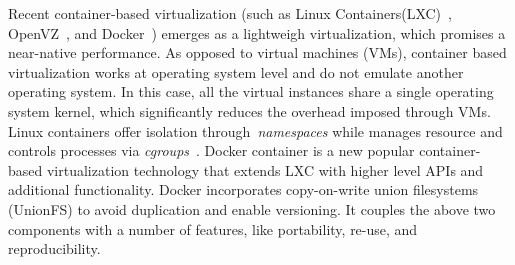 Recent container-based virtualization (such as Linux Containers(LXC)~\cite{xxx},
OpenVZ~\cite{bibid}, and Docker~\cite{}) emerges as a lightweigh virtualization,
which promises a near-native performance.
%
As opposed to virtual machines (VMs), container based virtualization works at
operating system level and do not emulate another operating system.
%
In this case, all the virtual instances share a single operating system kernel,
which significantly reduces the overhead imposed through VMs.
%
Linux containers offer isolation through~\textit{namespaces} while manages resource
and controls processes via \textit{cgroups}~\cite{}.
%
Docker container is a new popular container-based virtualization technology that
extends LXC with higher level APIs and additional functionality.
%
%
Docker incorporates copy-on-write union filesystems (UnionFS) to avoid duplication
and enable versioning.
%
It couples the above two components with a number of features, like portability,
re-use, and reproducibility.






